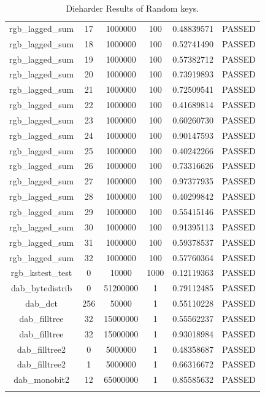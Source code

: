 \begin{longtable}{cccccc}
rgb\_lagged\_sum & 17 & 1000000 & 100 & 0.48839571 & PASSED \\
rgb\_lagged\_sum & 18 & 1000000 & 100 & 0.52741490 & PASSED \\
rgb\_lagged\_sum & 19 & 1000000 & 100 & 0.57382712 & PASSED \\
rgb\_lagged\_sum & 20 & 1000000 & 100 & 0.73919893 & PASSED \\
rgb\_lagged\_sum & 21 & 1000000 & 100 & 0.72509541 & PASSED \\
rgb\_lagged\_sum & 22 & 1000000 & 100 & 0.41689814 & PASSED \\
rgb\_lagged\_sum & 23 & 1000000 & 100 & 0.60260730 & PASSED \\
rgb\_lagged\_sum & 24 & 1000000 & 100 & 0.90147593 & PASSED \\
rgb\_lagged\_sum & 25 & 1000000 & 100 & 0.40242266 & PASSED \\
rgb\_lagged\_sum & 26 & 1000000 & 100 & 0.73316626 & PASSED \\
rgb\_lagged\_sum & 27 & 1000000 & 100 & 0.97377935 & PASSED \\
rgb\_lagged\_sum & 28 & 1000000 & 100 & 0.40299842 & PASSED \\
rgb\_lagged\_sum & 29 & 1000000 & 100 & 0.55415146 & PASSED \\
rgb\_lagged\_sum & 30 & 1000000 & 100 & 0.91395113 & PASSED \\
rgb\_lagged\_sum & 31 & 1000000 & 100 & 0.59378537 & PASSED \\
rgb\_lagged\_sum & 32 & 1000000 & 100 & 0.57760364 & PASSED \\
rgb\_kstest\_test & 0 & 10000 & 1000 & 0.12119363 & PASSED \\
dab\_bytedistrib & 0 & 51200000 & 1 & 0.79112485 & PASSED \\
dab\_dct & 256 & 50000 & 1 & 0.55110228 & PASSED \\
dab\_filltree & 32 & 15000000 & 1 & 0.55562237 & PASSED \\
dab\_filltree & 32 & 15000000 & 1 & 0.93018984 & PASSED \\
dab\_filltree2 & 0 & 5000000 & 1 & 0.48358687 & PASSED \\
dab\_filltree2 & 1 & 5000000 & 1 & 0.66316672 & PASSED \\
dab\_monobit2 & 12 & 65000000 & 1 & 0.85585632 & PASSED \\
\bottomrule
\caption{Dieharder Results of Random keys.}
\label{table}
\end{longtable}

